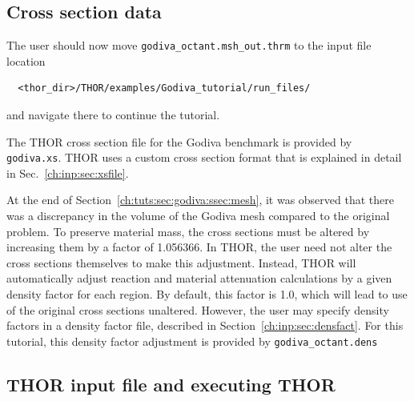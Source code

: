 \subsection{Cross section data}

The user should now move \verb"godiva_octant.msh_out.thrm" to the input file location
\begin{verbatim}
  <thor_dir>/THOR/examples/Godiva_tutorial/run_files/
\end{verbatim}
and navigate there to continue the tutorial.

The THOR cross section file for the Godiva benchmark is provided by \verb"godiva.xs".
THOR uses a custom cross section format that is explained in detail in Sec.~\ref{ch:inp:sec:xsfile}.

At the end of Section~\ref{ch:tuts:sec:godiva:ssec:mesh}, it was observed that there was a discrepancy in the volume of the Godiva mesh compared to the original problem.
To preserve material mass, the cross sections must be altered by increasing them by a factor of 1.056366.
In THOR, the user need not alter the cross sections themselves to make this adjustment.
Instead, THOR will automatically adjust reaction and material attenuation calculations by a given density factor for each region.
By default, this factor is 1.0, which will lead to use of the original cross sections unaltered.
However, the user may specify density factors in a density factor file, described in Section~\ref{ch:inp:sec:densfact}.
For this tutorial, this density factor adjustment is provided by \verb"godiva_octant.dens"

\subsection{THOR input file and executing THOR}


